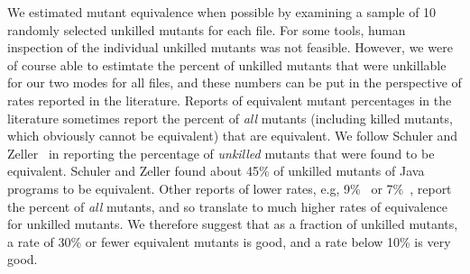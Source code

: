 \documentclass[sigconf,review, anonymous]{acmart}
\begin{document}
We estimated mutant equivalence when possible by examining a sample of
10 randomly selected unkilled mutants for each file.  For some tools,
human inspection of the individual unkilled mutants was not feasible.
However, we were of course able to estimtate the percent of unkilled
mutants that were unkillable for our two modes for all files, and
these numbers can be put in the perspective of rates reported in the
literature.  Reports of equivalent mutant percentages in the
literature sometimes report the percent of \emph{all} mutants
(including killed mutants, which obviously cannot be equivalent) that
are equivalent.  We follow Schuler and Zeller~\cite{EquivMut} in
reporting the percentage of \emph{unkilled} mutants that were found to
be equivalent.  Schuler and Zeller found about 45\% of unkilled
mutants of Java programs to be equivalent.  Other reports of lower
rates, e.g, 9\%~\cite{offutt1997automatically} or 7\%~\cite{TCE}, report the percent of
\emph{all} mutants, and so translate to much higher rates of
equivalence for unkilled mutants.  We therefore suggest that as a
fraction of unkilled mutants, a rate of 30\% or fewer equivalent
mutants is good, and a rate below 10\% is very good.
\end{document}
